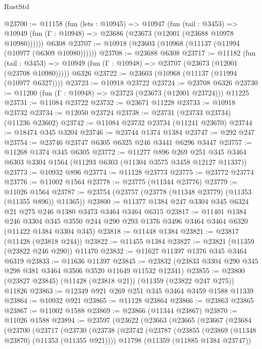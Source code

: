 \begin{lexlean}{RustStd}
\begin{coremodule}
{{{{{{{{{{{{{{{{{{{@23700 := @11158
    (fun (lets : @10945) =>
    @10947
      (fun (tail : @3453) =>
      @10949 (fun (Γ : @10948) => @23686 (@23673 (@12001 (@23688 @10978 @10980))))))
    @6308
@23707 := @10918 (@23603 (@10968 (@11137 (@11994 (@10977 (@6309 @10980))))))
@23708 := @23688 @6308
@23717 := @11182
    (fun (tail : @3453) => @10949 (fun (Γ : @10948) => @23707 (@23673 (@12001 (@23708 @10980)))))
    @6326
@23722 := @23603 (@10968 (@11137 (@11994 (@10977 @6327))))
@23723 := @10918 @23722
@23724 := @23708 @6326
@23730 := @11200 (fun (Γ : @10948) => @23723 (@23673 (@12001 @23724))) @11225
@23731 := @11084 @23722
@23732 := @23671 @11228
@23733 := @10918 @23732
@23734 := @12050 @23724
@23738 := @23731 (@23733 @23734) (@11236 @23602)
@23742 := @11084 @23732 @23734 (@11241 @23670)
@23744 := @18474 @345 @3204
@23746 := @23744 @1374 @1384
@23747 := @292 @247
@23754 := @23746 @23747 @6305 @6325 @246 @3441 @6296 @3447
@23757 := @11268 @1374 @345 @6305
@23772 := @11277
    @896
    @269
    @251
    @345
    @3464
    @6303
    @3304
    @1564
    (@11293 @6303 (@11304 @3575 @3458 @12127 @11337))
@23773 := @10932 @896
@23774 := @11128 @23773
@23775 := @23772 @23774
@23776 := @11002 @1564
@23778 := @23775 (@11344 @23776)
@23779 := @11026 @1564
@23787 := @23754 (@23757 (@23778 (@11348 @23779) (@11353 (@11355 @896)) @11365))
@23800 := @11377 @1384 @247 @3304 @345 @6324 @21 @275 @246 @1380 @3473 @3464 @3464 @6315
@23817 := @11401
    @1384
    @246
    @3304
    @345
    @3550
    @244
    @290
    @293
    @1376
    @3496
    @3464
    @3464
    @6320
    (@11422 @1384 @3304 @345)
@23818 := @11448 @1384
@23821 := @23817 (@11428 (@23818 @244))
@23822 := @11455 @1384
@23827 := @23821 (@11359 (@23822 @246 @290)) @11470
@23832 := @11627 @11397 @1376 @345 @3464 @6319
@23833 := @11636 @11397
@23845 := @23832 (@23833 @3304 @290 @345 @298 @381 @3464 @3506 @3520 @11649 @11532 @12341)
@23855 := @23800 (@23827 @23845) (@11428 (@23818 @21)) (@11359 (@23822 @247 @275)) @11826
@23863 := @12349 @921 @269 @251 @345 @3464 @3459 @1588 @11339
@23864 := @10932 @921
@23865 := @11128 @23864
@23866 := @23863 @23865
@23867 := @11002 @1588
@23869 := @23866 (@11344 @23867)
@23870 := @11026 @1588
@23894 := @23597
    (@23622
      (@23663
        (@23665
          (@23667
            (@23684
              (@23700
                (@23717
                  (@23730
                    (@23738
                      (@23742
                        (@23787
                          (@23855 (@23869 (@11348 @23870) (@11353 (@11355 @921))))
                          @11798
                          (@11359 (@11885 @1384 @23747))
}}}}}}}}}}}}}}}}}}}
\end{coremodule}
\end{lexlean}
